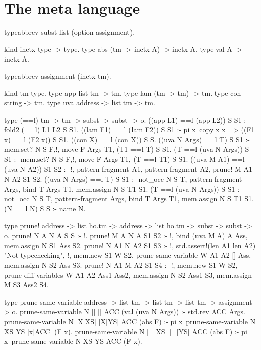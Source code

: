 \section{The meta language}
\begin{elpicode}
  typeabbrev subst list (option assignment).

  kind inctx type -> type.
  type abs (tm -> inctx A) -> inctx A.
  type val A -> inctx A.

  typeabbrev assignment (inctx tm).

  kind tm  type.
  type app list tm -> tm.
  type lam (tm -> tm) -> tm.
  type con string -> tm.
  type uva  address -> list tm -> tm.

  type (==l) tm -> tm -> subst -> subst ->  o.
  ((app L1) ==l (app L2)) S S1 :- fold2 (==l) L1 L2 S S1.
  ((lam F1) ==l (lam F2)) S S1 :- 
    pi x\ copy x x => ((F1 x) ==l (F2 x)) S S1.
  ((con X) ==l (con X)) S S.
  ((uva N Args) ==l T) S S1 :- 
    mem.set? N S F,!, move F Args T1, (T1 ==l T) S S1.
  (T ==l (uva N Args)) S S1 :- 
    mem.set? N S F,!, move F Args T1, (T ==l T1) S S1.
  ((uva M A1) ==l (uva N A2)) S1 S2 :- !, 
    pattern-fragment A1, pattern-fragment A2, 
    prune! M A1 N A2 S1 S2.
  ((uva N Args) ==l T) S S1 :- not_occ N S T, pattern-fragment Args, 
    bind T Args T1, mem.assign N S T1 S1.
  (T ==l (uva N Args)) S S1 :- not_occ N S T, pattern-fragment Args, 
    bind T Args T1, mem.assign N S T1 S1.
  (N ==l N) S S :- name N.

  type prune! address -> list ho.tm -> address -> 
              list ho.tm -> subst -> subst -> o.
  prune! N A  N A  S S :- !.
  prune! M A  N A  S1 S2 :- !, bind (uva M A) A Ass, 
    mem.assign N S1 Ass S2.
  prune! N A1 N A2 S1 S3 :- !,
    std.assert!(len A1 {len A2}) "Not typechecking", !,
    mem.new S1 W S2, prune-same-variable W A1 A2 [] Ass,
    mem.assign N S2 Ass S3.
  prune! N A1 M A2 S1 S4 :- !,
    mem.new S1 W S2, prune-diff-variables W A1 A2 Ass1 Ass2, 
    mem.assign N S2 Ass1 S3,
    mem.assign M S3 Ass2 S4. 

  type prune-same-variable address -> list tm -> list tm -> 
                            list tm -> assignment -> o.
  prune-same-variable N [] [] ACC (val (uva N Args)) :- 
    std.rev ACC Args.
  prune-same-variable N [X|XS] [X|YS] ACC (abs F) :- 
    pi x\ prune-same-variable N XS YS [x|ACC] (F x).
  prune-same-variable N [_|XS] [_|YS] ACC (abs F) :- 
    pi x\ prune-same-variable N XS YS ACC (F x).


\end{elpicode}
